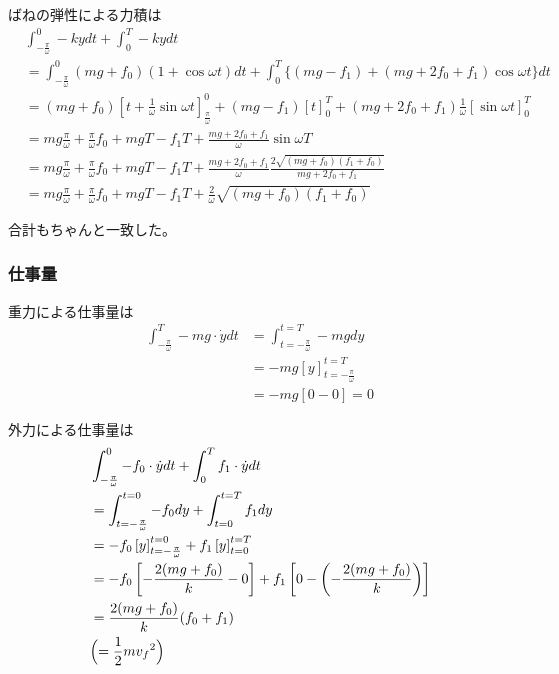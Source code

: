 \documentclass[a4paper,11pt]{jsarticle}
\begin{document}
ばねの弾性による力積は
\begin{align}
   & \int_{-\frac{\pi}{\omega}}^0 -ky dt
  + \int_0^T -ky dt
  \\
   & = \int_{-\frac{\pi}{\omega}}^0 (mg + f_0)( 1 + \cos \omega t ) dt
  + \int_0^T \Big\{ (mg-f_1) + (mg + 2f_0 + f_1)\cos \omega t\Big\} dt
  \\
   & = (mg + f_0)\left[ t + \frac{1}{\omega} \sin \omega t\right]_{\frac{\pi}{\omega}}^0
  + (mg - f_1)\left[ t \right]_0^T
  + (mg + 2f_0 + f_1) \frac{1}{\omega} \left[ \sin \omega t \right]_0^T
  \\
   & = mg\frac{\pi}{\omega} + \frac{\pi}{\omega} f_0
  + mgT - f_1 T
  + \frac{mg + 2f_0 + f_1}{\omega} \sin \omega T
  \\
   & = mg\frac{\pi}{\omega} + \frac{\pi}{\omega} f_0
  + mgT - f_1 T
  + \frac{mg + 2f_0 + f_1}{\omega} \frac{2\sqrt{(mg + f_0)(f_1+f_0)}}{mg + 2f_0 + f_1}
  \\
   & = mg\frac{\pi}{\omega} + \frac{\pi}{\omega} f_0
  + mgT - f_1 T
  + \frac{2}{\omega} \sqrt{(mg + f_0)(f_1+f_0)}
\end{align}

合計もちゃんと一致した。

\subsubsection{仕事量}
重力による仕事量は
\begin{align}
  \int_{-\frac{\pi}{\omega}}^{T} -mg\cdot \dot{y} dt
   & = \int_{t=-\frac{\pi}{\omega}}^{t=T} -mgdy
  \\
   & =-mg\left[ y \right]_{t=-\frac{\pi}{\omega}}^{t=T}
  \\
   & = -mg\left[ 0 - 0 \right] = 0
\end{align}

外力による仕事量は
\begin{align}
   & \int_{-\frac{\pi}{\omega}}^{0} -f_0 \cdot \dot{y} dt
  + \int_{0}^{T} f_1 \cdot \dot{y} dt
  \\
   & = \int_{t=-\frac{\pi}{\omega}}^{t=0} -f_0 dy
  + \int_{t=0}^{t=T} f_1 dy
  \\
   & = -f_0 \left[ y \right]_{t=-\frac{\pi}{\omega}}^{t=0}
  + f_1 \left[ y \right]_{t=0}^{t=T}
  \\
   & = -f_0 \left[ -\frac{2(mg + f_0)}{k} - 0 \right]
  + f_1 \left[ 0 - \left( -\frac{2(mg + f_0)}{k} \right) \right]
  \\
   & =\frac{2(mg + f_0)}{k}(f_0 + f_1)
  \\
   & \Bigl( = \frac{1}{2}m{v_f}^2 \Bigr)
\end{align}
\end{document}
